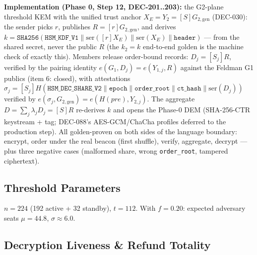 \documentclass[11pt, a4paper]{article}
\begin{document}
\textbf{Implementation (Phase 0, Step 12, DEC-201..203):} the G2-plane threshold KEM with the unified trust anchor $X_E = Y_2 = [S]G_{2,\mathrm{gen}}$ (DEC-030): the sender picks $r$, publishes $R = [r]G_{2,\mathrm{gen}}$, and derives $k = \texttt{SHA256}(\texttt{HSM\_KDF\_V1} \| \mathrm{ser}([r]X_E) \| \mathrm{ser}(X_E) \| \texttt{header})$ --- from the shared secret, never the public $R$ (the $k_2 = k$ end-to-end golden is the machine check of exactly this). Members release order-bound records: $D_j = [S_j]R$, verified by the pairing identity $e(G_1, D_j) = e(Y_{1,j}, R)$ against the Feldman G1 publics (item 6: closed), with attestations $\sigma_j = [S_j]H(\texttt{HSM\_DEC\_SHARE\_V2} \| \texttt{epoch} \| \texttt{order\_root} \| \texttt{ct\_hash} \| \mathrm{ser}(D_j))$ verified by $e(\sigma_j, G_{2,\mathrm{gen}}) = e(H(\textit{pre}), Y_{2,j})$. The aggregate $D = \sum_j \lambda_j D_j = [S]R$ re-derives $k$ and opens the Phase-0 DEM (SHA-256-CTR keystream + tag; DEC-088's AES-GCM/ChaCha profiles deferred to the production step). All golden-proven on both sides of the language boundary: encrypt, order under the real beacon (first shuffle), verify, aggregate, decrypt --- plus three negative cases (malformed share, wrong \texttt{order\_root}, tampered ciphertext).

\subsection{Threshold Parameters}

 $n = 224$ (192 active + 32 standby), $t = 112$. With $f = 0.20$: expected adversary seats $\mu = 44.8$, $\sigma \approx 6.0$.


\subsection{Decryption Liveness \& Refund Totality}
\end{document}
